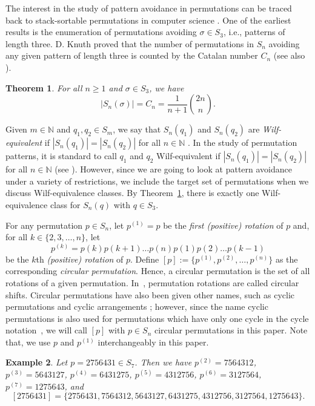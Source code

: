 \documentclass[10pt,a4paper]{amsart}
\newtheorem{theorem}{Theorem}[section]
\newtheorem{example}[theorem]{Example}
\numberwithin{equation}{section}
\begin{document}
The interest in the study of 
pattern avoidance in permutations can be traced back to 
stack-sortable permutations in computer science \cite[Section 2.1]{Kitaev2011}. 
One of the earliest results is the enumeration of permutations avoiding $\sigma\in S_3$, 
i.e., patterns of length three. D. Knuth proved that the number 
of permutations in $S_n$ avoiding any given pattern of length three is 
counted by the Catalan number $C_n$
(see also \cite[Theorem 4.7]{Bona2022}).

\begin{theorem} {\rm \cite[p. 238]{Knuth1973}} \label{Theorem:ClassicalSingle3}
For all $n\geq1$ and $\sigma\in S_3$, we have
\[
|S_n(\sigma)|=C_n=\frac{1}{n+1} \binom{2n}{n}.
\]
\end{theorem}

Given $m\in\mathbb{N}$ and $q_1,q_2\in S_m$, we say that $S_n(q_1)$ and $S_n(q_2)$ 
are \textit{Wilf-equivalent} if $|S_n(q_1)|=|S_n(q_2)|$ for all $n\in\mathbb{N}$ . In the study of permutation patterns, it is 
standard to call $q_1$ and $q_2$ Wilf-equivalent if $|S_n(q_1)|=|S_n(q_2)|$ for all $n\in\mathbb{N}$ (see \cite[Chapter 1]{Kitaev2011}). However, since we are going to look at pattern avoidance under a variety of restrictions, we include the target set of permutations when we discuss Wilf-equivalence classes. By Theorem~\ref{Theorem:ClassicalSingle3}, there is exactly one Wilf-equivalence class for $S_n(q)$ with $q\in S_3$.


For any permutation $p\in S_n$, let $p^{(1)}=p$ be the \textit{first (positive) rotation} of $p$ and, for all $k\in\{2,3,\ldots,n\}$, 
let \[p^{(k)}=p(k)p(k+1)\ldots p(n)p(1)p(2)\ldots p(k-1)\] be the $k$th \textit{(positive) 
rotation} of $p$. Define  
$[p]:=\{p^{(1)},p^{(2)},\ldots,p^{(n)}\}
$
as the corresponding \textit{circular permutation}. Hence, a circular permutation is the set of all rotations of a given permutation. In~\cite{GLW2018}, permutation rotations are called circular shifts. Circular permutations have also been given other names, such as cyclic permutations \cite{Li2022} and cyclic arrangements \cite{Vella2003}; however, since the name cyclic permutations is also used for permutations which have only one cycle in the cycle notation~\cite{AE2014, BC2019,Huang2019}, we will call $[p]$ with $p\in S_n$ circular permutations in this paper. Note that, we use $p$ and $p^{(1)}$ interchangeably in this paper.

\begin{example}
    Let $p=2756431\in S_7$. Then we have $p^{(2)}=7564312$, $p^{(3)}=5643127$, $p^{(4)}=6431275$, $p^{(5)}=4312756$, $p^{(6)}=3127564$, $p^{(7)}=1275643$, and \[[2756431]=\{2756431, 7564312, 5643127, 6431275, 4312756, 3127564, 1275643\}.\]
\end{example}
\end{document}
